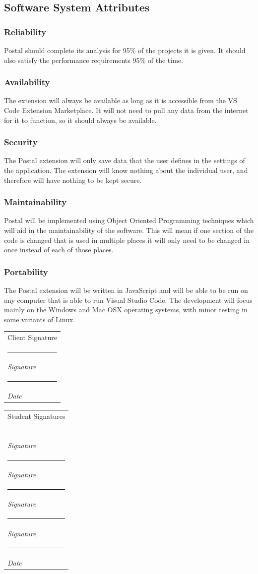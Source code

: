 \documentclass[letterpaper,10pt,titlepage,draftclsnofoot,onecolumn,onesided] {IEEEtran}
\makeatletter
\newcommand{\namesigdate}[2][4cm]{%
  \begin{tabular}{@{}p{#1}@{}}
    #2 \\[2\normalbaselineskip] \hrule \\[0pt]
    {\small \textit{Signature}} \\[2\normalbaselineskip] \hrule \\[0pt]
    {\small \textit{Date}}
  \end{tabular}
}
\newcommand{\studentnamesigdate}[2][4cm]{%
  \begin{tabular}{@{}p{#1}@{}}
    #2 \\[2\normalbaselineskip] \hrule \\[0pt]
    {\small \textit{Signature}} \\[2\normalbaselineskip] \hrule \\[0pt]
    {\small \textit{Signature}} \\[2\normalbaselineskip] \hrule \\[0pt]
    {\small \textit{Signature}} \\[2\normalbaselineskip] \hrule \\[0pt]
    {\small \textit{Signature}} \\[2\normalbaselineskip] \hrule \\[0pt]
    {\small \textit{Date}}
  \end{tabular}
}
\makeatother
\begin{document}
\subsection{Software System Attributes}

\subsubsection{Reliability}
Postal should complete its analysis for 95\% of the projects it is given. It should also satisfy the performance requirements 95\% of the time.   

\subsubsection{Availability}
The extension will always be available as long as it is accessible from the VS Code Extension Marketplace. 
It will not need to pull any data from the internet for it to function, so it should always be available.

\subsubsection{Security}
The Postal extension will only save data that the user defines in the settings of the application. 
The extension will know nothing about the individual user, and therefore will have nothing to be kept secure.

\subsubsection{Maintainability}
Postal will be implemented using Object Oriented Programming techniques which will aid in the maintainability of the software. 
This will mean if one section of the code is changed that is used in multiple places it will only need to be changed in once instead of each of those places.

\subsubsection{Portability}
The Postal extension will be written in JavaScript and will be able to be run on any computer that is able to run Visual Studio Code. 
The development will focus mainly on the Windows and Mac OSX operating systems, with minor testing in some variants of Linux.


\pagebreak

\namesigdate{Client Signature} \hfill 
\studentnamesigdate[4cm]{Student Signatures}
\end{document}
